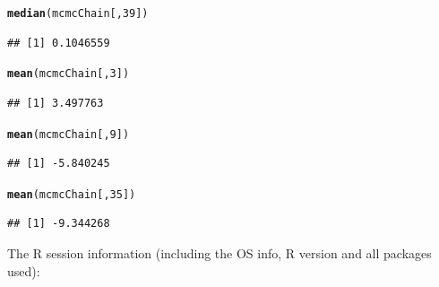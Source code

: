\documentclass{article}\usepackage[]{graphicx}\usepackage[]{color}
\makeatletter
\newcommand{\hlnum}[1]{\textcolor[rgb]{0.686,0.059,0.569}{#1}}%
\newcommand{\hlstd}[1]{\textcolor[rgb]{0.345,0.345,0.345}{#1}}%
\newcommand{\hlkwd}[1]{\textcolor[rgb]{0.737,0.353,0.396}{\textbf{#1}}}%
\newenvironment{kframe}{%
 \def\at@end@of@kframe{}%
 \ifinner\ifhmode%
  \def\at@end@of@kframe{\end{minipage}}%
  \begin{minipage}{\columnwidth}%
 \fi\fi%
 \def\FrameCommand##1{\hskip\@totalleftmargin \hskip-\fboxsep
 \colorbox{shadecolor}{##1}\hskip-\fboxsep
     \hskip-\linewidth \hskip-\@totalleftmargin \hskip\columnwidth}%
 \MakeFramed {\advance\hsize-\width
   \@totalleftmargin\z@ \linewidth\hsize
   \@setminipage}}%
 {\par\unskip\endMakeFramed%
 \at@end@of@kframe}
\newenvironment{knitrout}{}{} %
\makeatother
\begin{document}
\begin{knitrout}
{}


\begin{kframe}\begin{alltt}
\hlkwd{median}\hlstd{(mcmcChain[,}\hlnum{39}\hlstd{])}
\end{alltt}
\begin{verbatim}
## [1] 0.1046559
\end{verbatim}
\begin{alltt}
\hlkwd{mean}\hlstd{(mcmcChain[,}\hlnum{3}\hlstd{])}
\end{alltt}
\begin{verbatim}
## [1] 3.497763
\end{verbatim}
\begin{alltt}
\hlkwd{mean}\hlstd{(mcmcChain[,}\hlnum{9}\hlstd{])}
\end{alltt}
\begin{verbatim}
## [1] -5.840245
\end{verbatim}
\begin{alltt}
\hlkwd{mean}\hlstd{(mcmcChain[,}\hlnum{35}\hlstd{])}
\end{alltt}
\begin{verbatim}
## [1] -9.344268
\end{verbatim}
\end{kframe}
\end{knitrout}

The R session information (including the OS info, R version and all
packages used):
\end{document}
